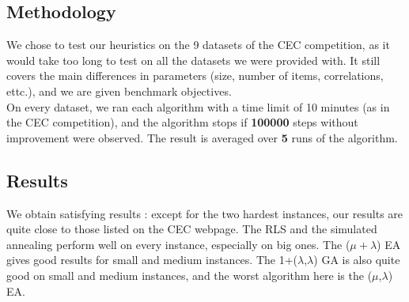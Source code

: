 \documentclass[a4paper]{article}
\begin{document}
\subsection{Methodology}
We chose to test our heuristics on the 9 datasets of the CEC competition, as it would take too long to test on all the datasets we were provided with. It still covers the main differences in parameters (size, number of items, correlations, ettc.), and we are given benchmark objectives. \\
On every dataset, we ran each algorithm with a time limit of 10 minutes (as in the CEC competition), and the algorithm stops if \textbf{100000} steps without improvement  were observed. The result is averaged over \textbf{5} runs of the algorithm.
\subsection{Results}
We obtain satisfying results : except for the two hardest instances, our results are quite close to those listed on the CEC webpage. The RLS and the simulated annealing perform well on every instance, especially on big ones. The ($\mu + \lambda$) EA gives good results for small and medium instances. The 1+($\lambda$,$\lambda$) GA is also quite good on small and medium instances, and the worst algorithm here is the ($\mu$,$\lambda$) EA.

\begin{center}
\end{center}

\begin{center}
\end{center}

\begin{center}
\end{center}
\end{document}
